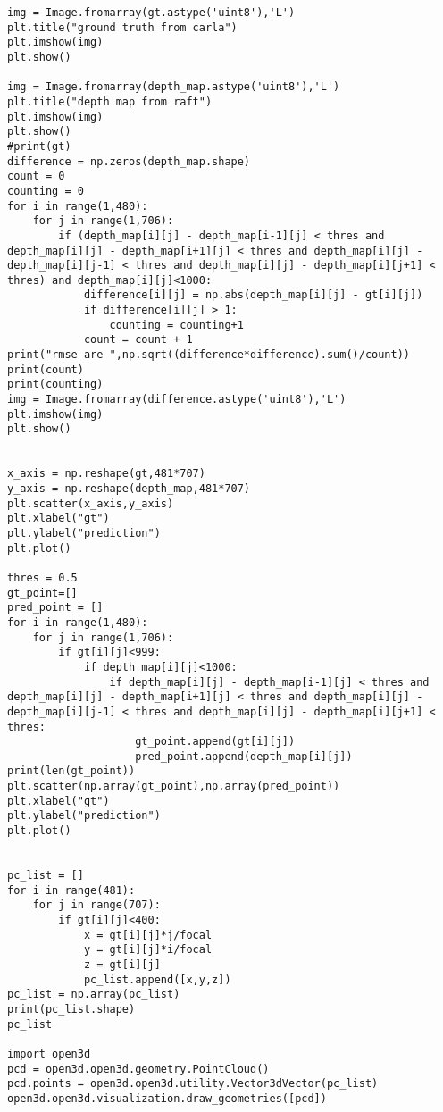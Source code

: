 \begin{lstlisting}
img = Image.fromarray(gt.astype('uint8'),'L')
plt.title("ground truth from carla")
plt.imshow(img)
plt.show()

img = Image.fromarray(depth_map.astype('uint8'),'L')
plt.title("depth map from raft")
plt.imshow(img)
plt.show()
#print(gt)
difference = np.zeros(depth_map.shape)
count = 0
counting = 0
for i in range(1,480):
    for j in range(1,706):
        if (depth_map[i][j] - depth_map[i-1][j] < thres and depth_map[i][j] - depth_map[i+1][j] < thres and depth_map[i][j] - depth_map[i][j-1] < thres and depth_map[i][j] - depth_map[i][j+1] < thres) and depth_map[i][j]<1000:
            difference[i][j] = np.abs(depth_map[i][j] - gt[i][j])
            if difference[i][j] > 1:
                counting = counting+1
            count = count + 1
print("rmse are ",np.sqrt((difference*difference).sum()/count))
print(count)
print(counting)
img = Image.fromarray(difference.astype('uint8'),'L')
plt.imshow(img)
plt.show()


x_axis = np.reshape(gt,481*707)
y_axis = np.reshape(depth_map,481*707)
plt.scatter(x_axis,y_axis)
plt.xlabel("gt")
plt.ylabel("prediction")
plt.plot()

thres = 0.5
gt_point=[]
pred_point = []
for i in range(1,480):
    for j in range(1,706):
        if gt[i][j]<999:
            if depth_map[i][j]<1000:
                if depth_map[i][j] - depth_map[i-1][j] < thres and depth_map[i][j] - depth_map[i+1][j] < thres and depth_map[i][j] - depth_map[i][j-1] < thres and depth_map[i][j] - depth_map[i][j+1] < thres:
                    gt_point.append(gt[i][j])
                    pred_point.append(depth_map[i][j])
print(len(gt_point))
plt.scatter(np.array(gt_point),np.array(pred_point))
plt.xlabel("gt")
plt.ylabel("prediction")
plt.plot()


pc_list = []
for i in range(481):
    for j in range(707):
        if gt[i][j]<400:
            x = gt[i][j]*j/focal
            y = gt[i][j]*i/focal
            z = gt[i][j]
            pc_list.append([x,y,z])
pc_list = np.array(pc_list)
print(pc_list.shape)
pc_list

import open3d
pcd = open3d.open3d.geometry.PointCloud()
pcd.points = open3d.open3d.utility.Vector3dVector(pc_list)
open3d.open3d.visualization.draw_geometries([pcd])
\end{lstlisting}